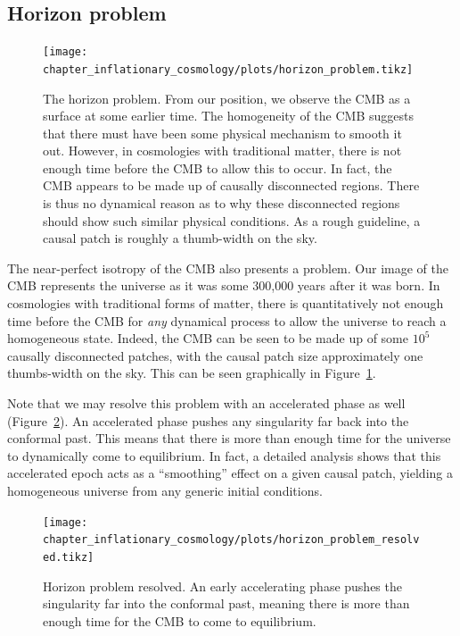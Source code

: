 \subsection{Horizon problem}
\begin{figure}
  \centering
  \texttt{[image: chapter\_inflationary\_cosmology/plots/horizon\_problem.tikz]}
  \caption{The horizon problem. From our position, we observe the CMB as a surface at some earlier time. The homogeneity of the CMB suggests that there must have been some physical mechanism to smooth it out. However, in cosmologies with traditional matter, there is not enough time before the CMB to allow this to occur. In fact, the CMB appears to be made up of causally disconnected regions. There is thus no dynamical reason as to why these disconnected regions should show such similar physical conditions. As a rough guideline, a causal patch is roughly a thumb-width on the sky.}\label{fig:cos:horizon_problem}
\end{figure}
The near-perfect isotropy of the CMB also presents a problem. Our image of the CMB represents the universe as it was some 300,000 years after it was born. In cosmologies with traditional forms of matter, there is quantitatively not enough time before the CMB for {\em any\/} dynamical process to allow the universe to reach a homogeneous state. Indeed, the CMB can be seen to be made up of some $10^{5}$ causally disconnected patches, with the causal patch size approximately one thumbs-width on the sky. This can be seen graphically in Figure~\ref{fig:cos:horizon_problem}.

Note that we may resolve this problem with an accelerated phase as well (Figure~\ref{fig:cos:horizon_problem_resolved}). An accelerated phase pushes any singularity far back into the conformal past. This means that there is more than enough time for the universe to dynamically come to equilibrium. In fact, a detailed analysis shows that this accelerated epoch acts as a ``smoothing'' effect on a given causal patch, yielding a homogeneous universe from any generic initial conditions.


\begin{figure}
  \centering
  \texttt{[image: chapter\_inflationary\_cosmology/plots/horizon\_problem\_resolved.tikz]}
  \caption{Horizon problem resolved. An early accelerating phase pushes the singularity far into the conformal past, meaning there is more than enough time for the CMB to come to equilibrium.\label{fig:cos:horizon_problem_resolved}}
\end{figure}

